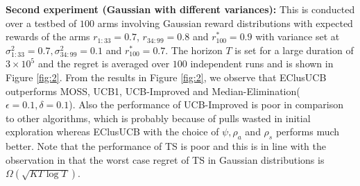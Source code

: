 \textbf{Second experiment (Gaussian with different variances):} This is conducted over a testbed of $100$ arms involving Gaussian reward distributions with expected rewards of the arms $r_{1:33}=0.7$, $r_{34:99}=0.8$ and $r^{*}_{100}=0.9$ with variance set at $\sigma_{1:33}^{2} = 0.7,\sigma_{34:99}^{2} = 0.1$ and $r^{*}_{100}=0.7$. The horizon $T$ is set for a large duration of $3\times 10^{5}$ and the regret is averaged over $100$ independent runs and is shown in Figure \ref{fig:2}. From the results in Figure \ref{fig:2}, we observe that EClusUCB outperforms MOSS, UCB1, UCB-Improved and Median-Elimination($\epsilon=0.1,\delta=0.1$). Also the performance of UCB-Improved is poor in comparison to other algorithms, which is probably because of pulls wasted in initial exploration whereas EClusUCB with the choice of $\psi, \rho_{a}$ and $\rho_{s}$ performs much better. Note that the performance of TS is poor and this is in line with the observation in \cite{lattimore2015optimally} that the worst case regret of TS in Gaussian distributions is $\Omega\left( \sqrt{KT\log T}\right)$.

